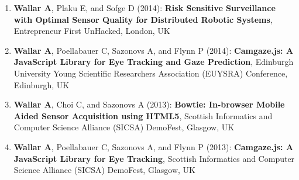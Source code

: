 \documentclass[line,margin]{cv}
\begin{document}
\begin{resume}
\begin{enumerate}
    \item \textbf{Wallar A}, Plaku E, and Sofge D (2014): \textbf{Risk
        Sensitive Surveillance with Optimal Sensor Quality for Distributed
        Robotic Systems}, Entrepreneur First UnHacked, London, UK

    \item \textbf{Wallar A}, Poellabauer C, Sazonovs A, and Flynn P (2014):
        \textbf{Camgaze.js: A JavaScript Library for Eye Tracking and Gaze
        Prediction}, Edinburgh University Young Scientific Researchers
        Association (EUYSRA) Conference, Edinburgh, UK

    \item \textbf{Wallar A}, Choi C, and Sazonovs A (2013): \textbf{Bowtie:
        In-browser Mobile Aided Sensor Acquisition using HTML5}, Scottish
        Informatics and Computer Science Alliance (SICSA) DemoFest,
        Glasgow, UK

    \item \textbf{Wallar A}, Poellabauer C, Sazonovs A, and Flynn P (2013):
        \textbf{Camgaze.js: A JavaScript Library for Eye Tracking}, Scottish
        Informatics and Computer Science Alliance (SICSA) DemoFest, Glasgow, UK

\end{enumerate}

%
%
%

\end{resume}
\end{document}
